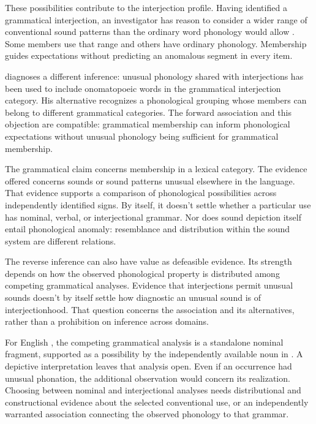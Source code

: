 \documentclass[12pt]{article}
\begin{document}
These possibilities contribute to the interjection profile. Having
identified a grammatical interjection, an investigator has reason to
consider a wider range of conventional sound patterns than the ordinary
word phonology would allow \citep[105--106]{ameka1992}. Some members
use that range and others have ordinary phonology. Membership guides
expectations without predicting an anomalous segment in every item.

\textcite[112--113]{ameka1992} diagnoses a different inference: unusual
phonology shared with interjections has been used to include onomatopoeic
words in the grammatical interjection category. His alternative recognizes
a phonological grouping whose members can belong to different grammatical
categories. The forward association and this objection are compatible:
grammatical membership can inform phonological expectations without unusual
phonology being sufficient for grammatical membership.

The grammatical claim concerns membership in a lexical category. The
evidence offered concerns sounds or sound patterns unusual elsewhere in
the language. That evidence supports a comparison of phonological
possibilities across independently identified signs. By itself, it doesn't
settle whether a particular use has nominal, verbal, or interjectional
grammar. Nor does sound depiction itself entail phonological anomaly: resemblance
and distribution within the sound system are different relations.

The reverse inference can also have value as defeasible evidence.
Its strength depends on how the observed phonological property is
distributed among competing grammatical analyses. Evidence that interjections
permit unusual sounds doesn't by itself settle how diagnostic an unusual
sound is of interjectionhood. That question concerns the association
and its alternatives, rather than a prohibition on inference across domains.

For English , the competing grammatical analysis is a
standalone nominal fragment, supported as a possibility by the independently
available noun in . A depictive interpretation leaves
that analysis open. Even if an occurrence had unusual phonation, the
additional observation would concern its realization. Choosing between
nominal and interjectional analyses needs distributional and constructional
evidence about the selected conventional use, or an independently warranted
association connecting the observed phonology to that grammar.
\end{document}
